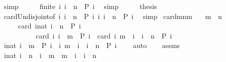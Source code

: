 \begin{isabellebody}
\ simp\isanewline
\ \ \isamarkupfalse%
\ \isamarkupfalse%
\ {\isacartoucheopen}finite\ {\isacharbraceleft}i{\isachardot}\ i\ {\isacharequal}\ n\ {\isasymand}\ P\ i{\isacharbraceright}{\isacartoucheclose}\ \isamarkupfalse%
\ simp\isanewline
\ \ \isamarkupfalse%
\ \isamarkupfalse%
\ {\isacharquery}thesis\isanewline
\ \ \ \ \isamarkupfalse%
\ card{\isacharunderscore}Un{\isacharunderscore}disjoint{\isacharbrackleft}of\ {\isacartoucheopen}{\isacharbraceleft}i{\isachardot}\ i\ {\isacharless}\ n\ {\isasymand}\ P\ i{\isacharbraceright}{\isacartoucheclose}\ {\isacartoucheopen}{\isacharbraceleft}i{\isachardot}\ i\ {\isacharequal}\ n\ {\isasymand}\ P\ i{\isacharbraceright}{\isacartoucheclose}{\isacharbrackright}\ \isamarkupfalse%
\ simp\isanewline
{}\isamarkupfalse%
%
\endisatagproof
{\isafoldproof}%
%
\isadelimproof
\isanewline
%
\endisadelimproof
\isanewline
{}\isamarkupfalse%
\ card{\isacharunderscore}mnm{\isacharcolon}\isanewline
\ \ \ {\isacartoucheopen}m\ {\isacharless}\ n{\isacartoucheclose}\isanewline
\ \ \ \ \ {\isacartoucheopen}card\ {\isacharbraceleft}i{\isacharcolon}{\isacharcolon}nat{\isachardot}\ i\ {\isacharless}\ n\ {\isasymand}\ P\ i{\isacharbraceright}\isanewline
\ \ \ \ \ \ \ \ \ {\isacharequal}\ card\ {\isacharbraceleft}i{\isachardot}\ i\ {\isasymle}\ m\ {\isasymand}\ P\ i{\isacharbraceright}\ {\isacharplus}\ card\ {\isacharbraceleft}i{\isachardot}\ m\ {\isacharless}\ i\ {\isasymand}\ i\ {\isacharless}\ n\ {\isasymand}\ P\ i{\isacharbraceright}{\isacartoucheclose}\isanewline
%
\isadelimproof
%
\endisadelimproof
%
\isatagproof
{}\isamarkupfalse%
\ {\isacharminus}\isanewline
\ \ \isamarkupfalse%
\ {}{\isacharcolon}{\isacartoucheopen}{\isacharbraceleft}i{\isacharcolon}{\isacharcolon}nat{\isachardot}\ i\ {\isasymle}\ m\ {\isasymand}\ P\ i{\isacharbraceright}\ {\isasyminter}\ {\isacharbraceleft}i{\isachardot}\ m\ {\isacharless}\ i\ {\isasymand}\ i\ {\isacharless}\ n\ {\isasymand}\ P\ i{\isacharbraceright}\ {\isacharequal}\ {\isacharbraceleft}{\isacharbraceright}{\isacartoucheclose}\ \isamarkupfalse%
\ auto\isanewline
\ \ \isamarkupfalse%
\ assms\ \isamarkupfalse%
\ {\isacartoucheopen}{\isasymforall}i{\isacharcolon}{\isacharcolon}nat{\isachardot}\ i\ {\isacharless}\ n\ {\isacharequal}\ {\isacharparenleft}i\ {\isasymle}\ m{\isacharparenright}\ {\isasymor}\ {\isacharparenleft}m\ {\isacharless}\ i\ {\isasymand}\ i\ {\isacharless}\ n{\isacharparenright}{\isacartoucheclose}\isanewline

\end{isabellebody}
